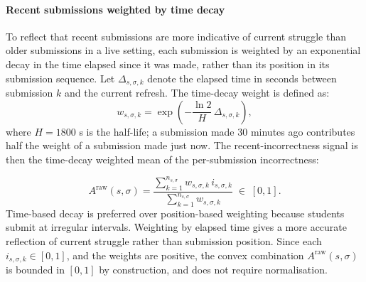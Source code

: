 \paragraph{Recent submissions weighted by time decay}
To reflect that recent submissions are more indicative of current struggle than older submissions in a live setting, each submission is weighted by an exponential decay in the time elapsed since it was made, rather than its position in its submission sequence. 
Let $\Delta_{s,\sigma,k}$ denote the elapsed time in seconds between submission $k$ and the current refresh. The time-decay weight is defined as:
\begin{equation}
    w_{s,\sigma,k} = \exp\!\left(-\frac{\ln 2}{H}\,\Delta_{s,\sigma,k}\right),
    \label{eq:time-decay-weight}
\end{equation}
where $H = 1800$ s is the half-life; a submission made 30 minutes ago contributes half the weight of a submission made just now. 
The recent-incorrectness signal is then the time-decay weighted mean of the per-submission incorrectness:

\begin{equation}
    A^{\mathrm{raw}}(s,\sigma)
    = \frac{\sum_{k=1}^{n_{s,\sigma}} w_{s,\sigma,k}\, i_{s,\sigma,k}}
           {\sum_{k=1}^{n_{s,\sigma}} w_{s,\sigma,k}}
    \;\in\; [0,1].
    \label{eq:a-raw}
\end{equation}
Time-based decay is preferred over position-based weighting because students submit at irregular intervals. Weighting by elapsed time gives a more accurate reflection of current struggle rather than submission position. 
Since each $i_{s,\sigma,k} \in [0,1]$, and the weights are positive, the convex combination $A^{\mathrm{raw}}(s,\sigma)$ is bounded in $[0,1]$ by construction, and does not require normalisation.
    

